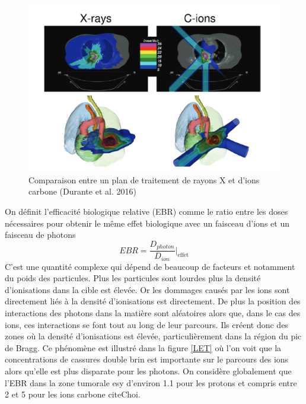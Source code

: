 \documentclass[11pt,a4paper,oldfontcommands]{memoir}
\begin{document}
\begin{figure}
    \centering
    \includegraphics[scale = 0.7]{intro/xrvshDuranteetal2016.png}
    \caption{Comparaison entre un plan de traitement de rayons X et d'ions carbone (Durante et al. 2016)}
    \label{CvsG}
\end{figure}

On définit l'efficacité biologique relative (EBR) comme le ratio entre les doses nécessaires pour obtenir le même effet biologique avec un faisceau d'ions et un faisceau de photons
$$EBR = \frac{D_{photon}}{D_{ion}}\bigg|_{\mathrm{effet}}$$
C'est une quantité complexe qui dépend de beaucoup de facteurs et notamment du poids des particules. Plus les particules sont lourdes plus la densité d'ionisations dans la cible est élevée. Or les dommages causés par les ions sont directement liés à la densité d'ionisations est directement. De plus la position des interactions des photons dans la matière sont aléatoires alors que, dans le cas des ions, ces interactions se font tout au long de leur parcours. Ils créent donc des zones où la densité d'ionisations est élevée, particulièrement dans la région du pic de Bragg. Ce phénomène est illustré dans la figure \ref{LET} où l'on voit que la concentrations de cassures double brin est importante sur le parcours des ions alors qu'elle est plus disparate pour les photons. On considère globalement que l'EBR dans la zone tumorale esy d'environ 1.1 pour les protons et compris entre 2 et 5 pour les ions carbone cite{Choi}. 
\end{document}
